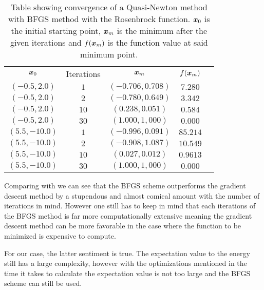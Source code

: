         \begin{table}[H]
            \centering
            \setlength{\tabcolsep}{34.3pt}
            \caption{Table showing convergence of a Quasi-Newton method with
            BFGS method with the Rosenbrock function. $\boldsymbol{{x}}_0$ is the
            initial starting point, $\boldsymbol{{x}}_m$ is the minimum after the given
            iterations and $f(\boldsymbol{{x}}_m)$ is the function value at said
            minimum point.}
            \label{tab:rosenbrockconvBFGS}
            \begin{tabular}{ccccc} \hline\hline
                $\boldsymbol{{x}}_0$ & Iterations & $\boldsymbol{{x}}_m$ & $f(\boldsymbol{{x}}_m)$ \\
                $(-0.5,2.0)$ & $1$ & $(-0.706,0.708)$ & $7.280$ \\
                $(-0.5,2.0)$ & $2$ & $(-0.780,0.649)$ & $3.342$ \\
                $(-0.5,2.0)$ & $10$ & $(0.238,0.051)$ & $0.584$ \\
                $(-0.5,2.0)$ & $30$ & $(1.000,1,000)$ & $0.000$ \\
                $(5.5,-10.0)$ & $1$ & $(-0.996,0.091)$ & $85.214$ \\
                $(5.5,-10.0)$ & $2$ & $(-0.908,1.087)$ & $10.549$ \\
                $(5.5,-10.0)$ & $10$ & $(0.027,0.012)$ & $0.9613$ \\
                $(5.5,-10.0)$ & $30$ & $(1.000,1,000)$ & $0.000$ \\ \hline\hline
            \end{tabular}
        \end{table}
    Comparing  with
     we can see that the BFGS
    scheme outperforms the gradient descent method by a stupendous and almost
    comical amount with the number of iterations in mind. However one still has
    to keep in mind that each iterations of the BFGS method is far more
    computationally extensive meaning the gradient descent method can be more
    favorable in the case where the function to be minimized is expensive to
    compute. 

    For our case, the latter sentiment is true. The expectation value to the
    energy still has a large complexity, however with the optimizations
    mentioned in  the time it takes to
    calculate the expectation value is not too large and the BFGS scheme can
    still be used.

